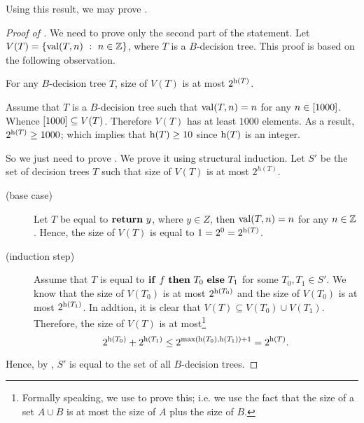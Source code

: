 Using this result, we may prove .
\begin{proof}[Proof of ]
  We need to prove only the second part of the statement.
  Let $V(T) = \set[n \in \Z]{\DTValue{T}{n}}$, where $T$ is a $B$-decision
  tree. This proof is based on the following observation.
  \begin{claim}
  \label{claim:guess-the-number}
    For any $B$-decision tree $T$, size of $V(T)$ is at most $2^{\DTHeight{T}}$.
  \end{claim}

  Assume that $T$ is a $B$-decision tree such that $\mathrm{val}({T}, {n}) = n$ for
  any $n \in {[{1000}]}$. Whence ${[{1000}]} \subseteq V(T)$. Therefore 
  $V(T)$ has at least $1000$ elements. As a result, $2^{\DTHeight{T}} \ge 1000$;
  which implies that $\DTHeight{T} \ge 10$ since $\DTHeight{T}$ is an integer.

  So we just need to prove . We prove it using
  structural induction. Let $S'$ be the set of decision trees $T$ such that size
  of $V(T)$ is at most $2^{h(T)}$.
  \begin{description}
    \item[(base case)] Let $T$ be equal to $\mathbf{return}~{y}$, where $y \in Z$, then 
      $\mathrm{val}({T}, {n}) = n$ for any $n \in {\mathbb{Z}}$. Hence, the size of $V(T)$ is
      equal to $1 = 2^0 = 2^{\DTHeight{T}}$.
    \item[(induction step)] Assume that $T$ is equal to $\mathbf{if}~{f}~\mathbf{then}~{T_0}~\mathbf{else}~{T_1}$ for
      some $T_0, T_1 \in S'$. We know that the size of $V(T_0)$ is at most
      $2^{\DTHeight{T_0}}$ and the size of $V(T_0)$ is at most
      $2^{\DTHeight{T_1}}$. In addtion, it is clear that 
      $V(T) \subseteq V(T_0) \cup V(T_1)$. Therefore,
      the size of $V(T)$ is at most\footnote{%
        Formally speaking, we use  to prove
        this; i.e. we use the fact that the size of a set $A \cup B$ is at most
        the size of $A$ plus the size of $B$.
      }
      \[
        2^{\DTHeight{T_0}} + 2^{\DTHeight{T_1}} \le 
          2^{\max(\DTHeight{T_0}, \DTHeight{T_1}) + 1} = 2^{\DTHeight{T}}.
      \]
  \end{description}
  Hence, by , $S'$ is equal to the set of all
  $B$-decision trees.
\end{proof}

